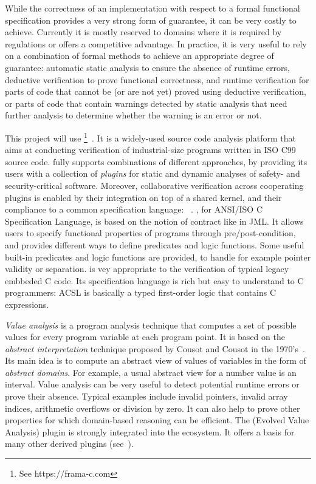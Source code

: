 While the correctness of an implementation with respect to a formal functional specification provides a very strong form of guarantee, it can be very costly to achieve.
Currently it is mostly reserved to domains where it is required by regulations or offers a competitive advantage.
In practice, it is very useful to rely on a combination of formal methods to achieve an appropriate degree of guarantee:
automatic static analysis to ensure the absence of runtime errors,
deductive verification to prove functional correctness,
and runtime verification for parts of code that cannot be (or are not yet) proved using deductive verification,
or parts of code that contain warnings detected by static analysis that need further analysis to determine whether the warning is an error or not.

This project will use \framac{}\footnote{See   https://frama-c.com}~\cite{KKP2015:FAC}.
It is a widely-used source code analysis platform that aims at conducting verification of industrial-size programs written in ISO C99 source code.
\framac{} fully supports combinations of different approaches, by providing its users with a collection of \emph{plugins} for static and dynamic analyses of safety- and security-critical software.
Moreover, collaborative verification across cooperating plugins is enabled by their integration on top of a shared kernel, and their compliance to a common specification language: \acsl~\cite{ACSL}.
\acsl, for ANSI/ISO C Specification Language, is based on the notion of contract like in JML.
It allows users to specify functional properties of programs through pre/post-condition, and provides different ways to define predicates and logic functions.
Some useful built-in predicates and logic functions are provided, to handle for example pointer validity or separation.
\framac is vey appropriate to the verification of typical legacy embbeded C code.
Its specification language is rich but easy to understand to C programmers: ACSL is basically a typed first-order logic that contains C expressions.

\emph{Value analysis} is a program analysis technique that computes a set of possible values for every program variable at each program point.
It is based on the \emph{abstract interpretation} technique proposed by Cousot and Cousot in the 1970's~\cite{cousot77}.
Its main idea is to compute an abstract view of values of variables in the form of \emph{abstract domains}.
For example, a usual abstract view for a number value is an interval.
Value analysis can be very useful to detect potential runtime errors or prove their absence.
Typical examples include invalid pointers, invalid array indices, arithmetic overflows or division by zero.
It can also help to prove other properties for which domain-based reasoning can be efficient.
The \Eva (Evolved Value Analysis) plugin is strongly integrated into the \framac ecosystem.
It offers a basis for many other derived plugins (see~\cite{KKP2015:FAC}).

